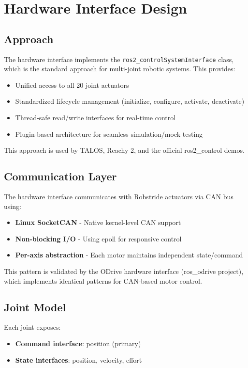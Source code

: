 \documentclass[12pt,a4paper]{article}
\newcommand{\code}[1]{\texttt{#1}}
\newcommand{\rc}{\code{ros2\_control}}
\begin{document}
\section{Hardware Interface Design}

\subsection{Approach}
The hardware interface implements the \rc \code{SystemInterface} class, which is the 
standard approach for multi-joint robotic systems. This provides:

\begin{itemize}
    \item Unified access to all 20 joint actuators
    \item Standardized lifecycle management (initialize, configure, activate, deactivate)
    \item Thread-safe read/write interfaces for real-time control
    \item Plugin-based architecture for seamless simulation/mock testing
\end{itemize}

This approach is used by TALOS, Reachy 2, and the official ros2\_control demos.

\subsection{Communication Layer}
The hardware interface communicates with Robstride actuators via CAN bus using:

\begin{itemize}
    \item \textbf{Linux SocketCAN} - Native kernel-level CAN support
    \item \textbf{Non-blocking I/O} - Using epoll for responsive control
    \item \textbf{Per-axis abstraction} - Each motor maintains independent state/command
\end{itemize}

This pattern is validated by the ODrive hardware interface (ros\_odrive project), 
which implements identical patterns for CAN-based motor control.

\subsection{Joint Model}
Each joint exposes:

\begin{itemize}
    \item \textbf{Command interface}: position (primary)
    \item \textbf{State interfaces}: position, velocity, effort
\end{itemize}
\end{document}
